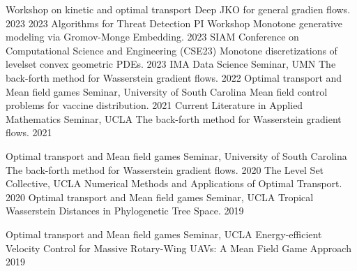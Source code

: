 


\begin{cvtalks}

\cvtalk
    {Workshop on kinetic and optimal transport} %
    {Deep JKO for general gradien flows.} %
    {2023} %
  \cvtalk
    {2023 Algorithms for Threat Detection PI Workshop} %
    {Monotone generative modeling via Gromov-Monge Embedding.} %
    {2023} %
  \cvtalk
    {SIAM Conference on Computational Science and Engineering (CSE23)} %
    {Monotone discretizations of levelset convex geometric PDEs.} %
    {2023} %
  \cvtalk
    {IMA Data Science Seminar, UMN} %
    {The back-forth method for Wasserstein gradient flows.} %
    {2022} %
  \cvtalk
    {Optimal transport and Mean field games Seminar, University of South Carolina} %
    {Mean field control problems for vaccine distribution.} %
    {2021} %
  \cvtalk
    {Current Literature in Applied Mathematics Seminar, UCLA} %
    {The back-forth method for Wasserstein gradient flows.} %
    {2021} %
\end{cvtalks}

\vspace{-4mm}

\begin{cvtalks}

  \cvtalk
    {Optimal transport and Mean field games Seminar, University of South Carolina} %
    {The back-forth method for Wasserstein gradient flows.} %
    {2020} %
  \cvtalk
    {The Level Set Collective, UCLA} %
    {Numerical Methods and Applications of Optimal Transport.} %
    {2020} %
  \cvtalk
    {Optimal transport and Mean field games Seminar, UCLA} %
    {Tropical Wasserstein Distances in Phylogenetic Tree Space.} %
    {2019} %
    
\end{cvtalks}

\vspace{-4mm}

\begin{cvtalks}

  \cvtalk
    {Optimal transport and Mean field games Seminar, UCLA} %
    {Energy-efficient Velocity Control for Massive Rotary-Wing UAVs: A Mean Field Game Approach} %
    {2019} %
\end{cvtalks}

